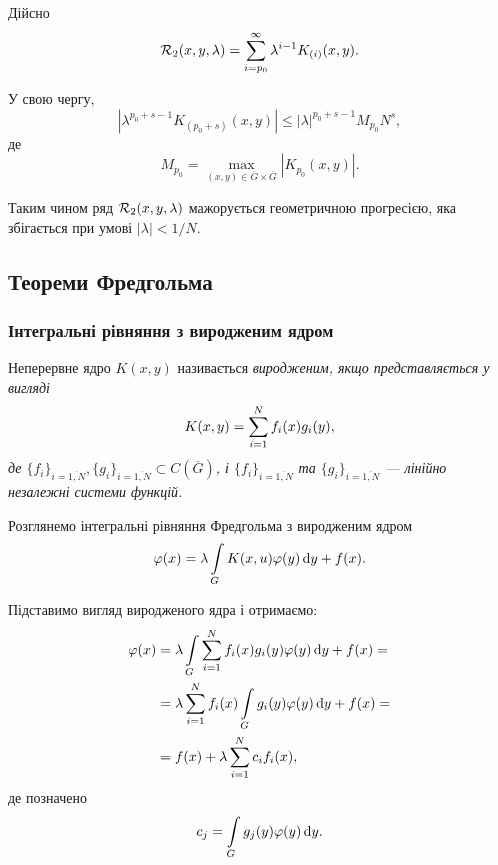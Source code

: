 Дійсно
\begin{equation}
	\cal{R}_2(x, y, \lambda) = \Sum_{i = p_0}^\infty \lambda^{i - 1} K_{(i)}(x, y).
\end{equation}

У свою чергу, 
\begin{equation}
	\left|\lambda^{p_0 + s - 1} K_{(p_0 + s)}(x, y)\right| \le |\lambda|^{p_0 + s - 1} M_{p_0} N^s,
\end{equation}
де
\begin{equation}
	M_{p_0} = \max_{(x, y) \in \overline G \times \overline G} |K_{p_0}(x, y)|.
\end{equation}

Таким чином ряд $\cal{R}_2(x, y, \lambda)$ мажорується геометричною прогресією, яка збігається при умові $|\lambda| < 1 / N$.

\subsection{Теореми Фредгольма}

\subsubsection{Інтегральні рівняння з виродженим ядром}

\begin{definition}
	Неперервне ядро $K(x, y)$ називається \it{виродженим}, якщо представляється у вигляді
	\begin{equation}
		K(x, y) = \Sum_{i = 1}^N f_i(x) g_i(y),
	\end{equation}
	де $\{ f_i \}_{i = \overline{1, N}}, \{ g_i \}_{i = \overline{1, N}} \subset C\left(\overline G\right)$, і $\{ f_i \}_{i = \overline{1, N}}$ та $\{ g_i \}_{i = \overline{1, N}}$ --- лінійно незалежні системи функцій.
\end{definition}

\begin{definition}
	Розглянемо інтегральні рівняння Фредгольма з виродженим ядром 
	\begin{equation}
		\phi(x) = \lambda \Int_G K(x, u) \phi(y) \diff y + f(x).
	\end{equation}
\end{definition}

Підставимо вигляд виродженого ядра і отримаємо:
\begin{equation}
	\begin{aligned}
		\phi(x) &= \lambda \Int_G \Sum_{i = 1}^N f_i(x) g_i(y) \phi(y) \diff y + f(x) = \\
		&= \lambda \Sum_{i = 1}^N f_i(x) \Int_G g_i(y) \phi(y) \diff y + f(x) = \\
		&= f(x) + \lambda \Sum_{i = 1}^N c_i f_i(x),
	\end{aligned}
\end{equation}
де позначено
\begin{equation}
	c_j = \Int_G g_j(y) \phi(y) \diff y.
\end{equation}

